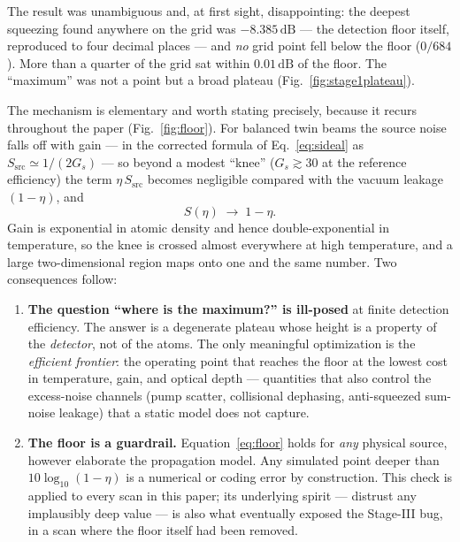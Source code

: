 \documentclass[11pt,a4paper]{article}
\newcommand{\dB}{\,\mathrm{dB}}
\begin{document}
The result was unambiguous and, at first sight, disappointing: the deepest
squeezing found anywhere on the grid was $-8.385\dB$ --- the detection floor
itself, reproduced to four decimal places --- and \emph{no} grid point fell
below the floor ($0/684$). More than a quarter of the grid sat within
$0.01\dB$ of the floor. The ``maximum'' was not a point but a broad plateau
(Fig.~\ref{fig:stage1plateau}).

The mechanism is elementary and worth stating precisely, because it recurs
throughout the paper (Fig.~\ref{fig:floor}). For balanced twin beams the
source noise falls off with gain --- in the corrected formula of
Eq.~\eqref{eq:sideal} as $S_{\mathrm{src}}\simeq 1/(2G_s)$ --- so beyond a
modest ``knee'' ($G_s\gtrsim 30$ at the reference efficiency) the term
$\eta\,S_{\mathrm{src}}$ becomes negligible compared with the vacuum leakage
$(1-\eta)$, and
\begin{equation}
S(\eta)\;\longrightarrow\;1-\eta .
\end{equation}
Gain is exponential in atomic density and hence double-exponential in
temperature, so the knee is crossed almost everywhere at high temperature,
and a large two-dimensional region maps onto one and the same number. Two
consequences follow:

\begin{enumerate}[nosep]
\item \textbf{The question ``where is the maximum?'' is ill-posed} at finite
      detection efficiency. The answer is a degenerate plateau whose height
      is a property of the \emph{detector}, not of the atoms. The only
      meaningful optimization is the \emph{efficient frontier}: the operating
      point that reaches the floor at the lowest cost in temperature, gain,
      and optical depth --- quantities that also control the excess-noise
      channels (pump scatter, collisional dephasing, anti-squeezed sum-noise
      leakage) that a static model does not capture.
\item \textbf{The floor is a guardrail.} Equation~\eqref{eq:floor} holds for
      \emph{any} physical source, however elaborate the propagation model.
      Any simulated point deeper than $10\log_{10}(1-\eta)$ is a numerical or
      coding error by construction. This check is applied to every scan in
      this paper; its underlying spirit --- distrust any implausibly deep
      value --- is also what eventually exposed the Stage-III bug, in a scan
      where the floor itself had been removed.
\end{enumerate}
\end{document}
